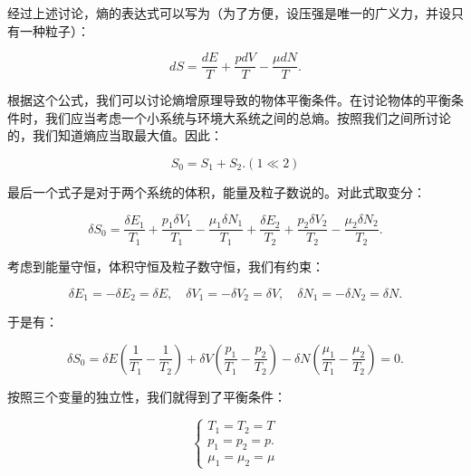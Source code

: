 经过上述讨论，熵的表达式可以写为（为了方便，设压强是唯一的广义力，并设只有一种粒子）：
\begin{linenomath}\begin{equation}
dS = \frac{dE}{T} + \frac{pdV}{T} -\frac{\mu dN}{T}.
\end{equation}\end{linenomath}


根据这个公式，我们可以讨论熵增原理导致的物体平衡条件。在讨论物体的平衡条件时，我们应当考虑一个小系统与环境大系统之间的总熵。按照我们之间所讨论的，我们知道熵应当取最大值。因此：
\begin{linenomath}\begin{equation}
S_0 = S_1 + S_{2}. (1\ll 2)
\end{equation}\end{linenomath}
最后一个式子是对于两个系统的体积，能量及粒子数说的。对此式取变分：
\begin{linenomath}\begin{equation}
\delta S_0 = \frac{\delta E_1}{T_1} + \frac{p_1\delta V_1}{T_1} -\frac{\mu_1 \delta N_1}{T_1} + \frac{\delta E_2}{T_2} + \frac{p_2\delta V_2}{T_2} -\frac{\mu_2 \delta N_2}{T_2}.
\end{equation}\end{linenomath}
考虑到能量守恒，体积守恒及粒子数守恒，我们有约束：
\begin{linenomath}\begin{equation}
\delta E_1 = -\delta E_2 = \delta E,\quad \delta V_1 = -\delta V_2 = \delta V,\quad \delta N_1 = -\delta N_2 = \delta N.
\end{equation}\end{linenomath}
于是有：
\begin{linenomath}\begin{equation}
\delta S_0 = \delta E\left( \frac1{T_1}-\frac1{T_2} \right) + \delta V\left( \frac{p_1}{T_1}-\frac{p_2}{T_2} \right) - \delta N\left( \frac{\mu_1}{T_1}-\frac{\mu_2}{T_2} \right) = 0.
\end{equation}\end{linenomath}
按照三个变量的独立性，我们就得到了平衡条件：
\begin{linenomath}\begin{equation}
\boxed{\begin{cases}
    T_1 = T_2 = T\\
    p_1 = p_2 = p.\\
    \mu_1 = \mu_2 = \mu
\end{cases}}
\label{equil_cond}
\end{equation}\end{linenomath}
